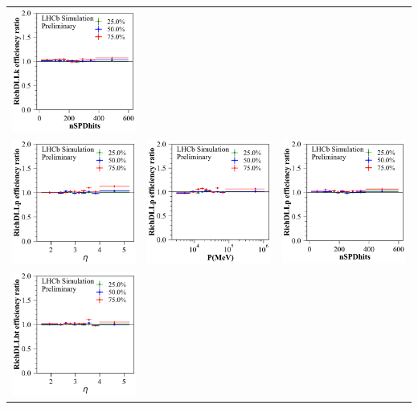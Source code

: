\documentclass{article}
\begin{document}
\begin{tabular}{l@{\hskip -0.0in}c@{\hskip -0.0in}c}
\includegraphics[width=0.32\linewidth]{eff_ratio_RichDLLk_vs_nSPDhits_at_[0.05, 0.1, 0.25, 0.5, 0.75, 0.9, 0.95].pdf} \\
\vspace{-0.2cm}
\includegraphics[width=0.32\linewidth]{eff_ratio_RichDLLp_vs_Brunel_ETA_at_[0.05, 0.1, 0.25, 0.5, 0.75, 0.9, 0.95].pdf} &
\includegraphics[width=0.32\linewidth]{eff_ratio_RichDLLp_vs_Brunel_P_at_[0.05, 0.1, 0.25, 0.5, 0.75, 0.9, 0.95].pdf} &
\includegraphics[width=0.32\linewidth]{eff_ratio_RichDLLp_vs_nSPDhits_at_[0.05, 0.1, 0.25, 0.5, 0.75, 0.9, 0.95].pdf} \\
\vspace{-0.2cm}
\includegraphics[width=0.32\linewidth]{eff_ratio_RichDLLbt_vs_Brunel_ETA_at_[0.05, 0.1, 0.25, 0.5, 0.75, 0.9, 0.95].pdf} &

\end{tabular}
\end{document}
